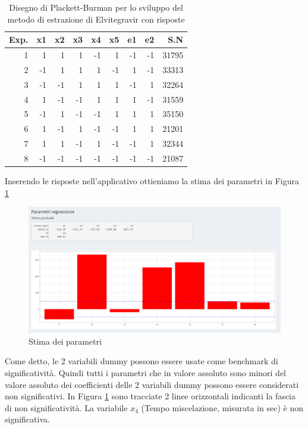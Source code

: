 \documentclass[
  11pt,
]{book}
\begin{document}
\begin{table}

\caption{\label{tab:pbes2}Disegno di Plackett-Burman per lo sviluppo del metodo di estrazione di Elvitegravir con risposte}
\centering
\begin{tabular}[t]{r|r|r|r|r|r|r|r|r}
\hline
Exp. & x1 & x2 & x3 & x4 & x5 & e1 & e2 & S.N\\
\hline
1 & 1 & 1 & 1 & -1 & 1 & -1 & -1 & 31795\\
\hline
2 & -1 & 1 & 1 & 1 & -1 & 1 & -1 & 33313\\
\hline
3 & -1 & -1 & 1 & 1 & 1 & -1 & 1 & 32264\\
\hline
4 & 1 & -1 & -1 & 1 & 1 & 1 & -1 & 31559\\
\hline
5 & -1 & 1 & -1 & -1 & 1 & 1 & 1 & 35150\\
\hline
6 & 1 & -1 & 1 & -1 & -1 & 1 & 1 & 21201\\
\hline
7 & 1 & 1 & -1 & 1 & -1 & -1 & 1 & 32344\\
\hline
8 & -1 & -1 & -1 & -1 & -1 & -1 & -1 & 21087\\
\hline
\end{tabular}
\end{table}

\newpage

Inserendo le risposte nell'applicativo ottieniamo la stima dei parametri in Figura \ref{fig:pb5}

\begin{figure}[ht]

{\centering \includegraphics[width=1\linewidth]{Immagini/PB/05_coeff1} 

}

\caption{Stima dei parametri}\label{fig:pb5}
\end{figure}

Come detto, le 2 variabili dummy possono essere usate come benchmark di significatività. Quindi tutti i parametri che in valore assoluto sono minori del valore assoluto dei coefficienti delle 2 variabili dummy possono essere considerati non significativi. In Figura \ref{fig:pb5} sono tracciate 2 linee orizzontali indicanti la fascia di non significatività. La variabile \(x_4\) (Tempo miscelazione, misurata in sec) è non significativa.
\end{document}
